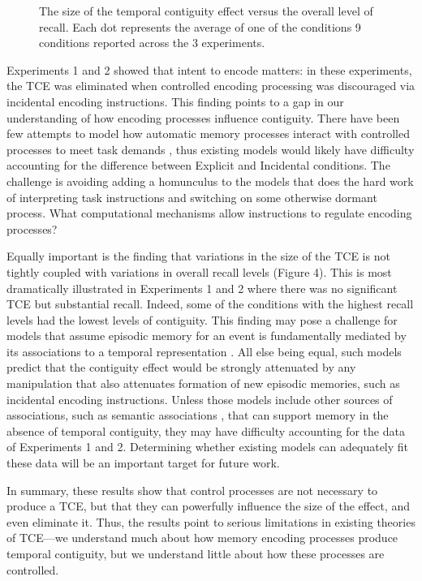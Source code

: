 \documentclass[jou,natbib,floatsintext]{apa6} %
\begin{document}
\begin{figure}%
\caption{The size of the temporal contiguity effect versus the overall level of recall. Each dot represents the average of one of the conditions 9 conditions reported across the 3 experiments.}
\label{door}
\end{figure}

Experiments 1 and 2 showed that intent to encode matters: in these experiments, the TCE was eliminated when controlled encoding processing was discouraged via incidental encoding instructions. This finding points to a gap in our understanding of how encoding processes influence contiguity. There have been few attempts to model how automatic memory processes interact with controlled processes to meet task demands \citep{LehmMalm13,PolyEtal09}, thus existing models would likely have difficulty accounting for the difference between Explicit and Incidental conditions. The challenge is avoiding adding a homunculus to the models that does the hard work of interpreting task instructions and switching on some otherwise dormant process. What computational mechanisms allow instructions to regulate encoding processes?

Equally important is the finding that variations in the size of the TCE is not tightly coupled with variations in overall recall levels (Figure 4). This is most dramatically illustrated in Experiments 1 and 2 where there was no significant TCE but substantial recall. Indeed, some of the conditions with the highest recall levels had the lowest levels of contiguity. This finding may pose a challenge for models that assume episodic memory for an event is fundamentally mediated by its associations to a temporal representation \citep[e.g.,][]{LohnEtal14,HealKaha15}. All else being equal, such models predict that the contiguity effect would be strongly attenuated by any manipulation that also attenuates formation of new episodic memories, such as incidental encoding instructions. Unless those models include other sources of associations, such as semantic associations \citep{PolyEtal09}, that can support memory in the absence of temporal contiguity, they may have difficulty accounting for the data of Experiments 1 and 2. Determining whether existing models can adequately fit these data will be an important target for future work.

In summary, these results show that control processes are not necessary to produce a TCE, but that they can powerfully influence the size of the effect, and even eliminate it. Thus, the results point to serious limitations in existing theories of TCE---we understand much about how memory encoding processes produce temporal contiguity, but we understand little about how these processes are controlled.
\end{document}
